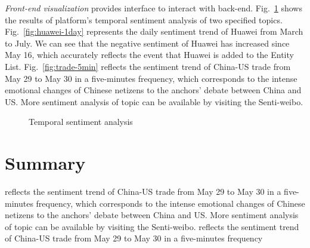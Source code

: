 \documentclass[runningheads]{llncs}
\begin{document}
\textit{Front-end visualization} provides interface to interact with back-end. Fig.~\ref{fig:sentiment-trend} shows the results of platform's temporal sentiment analysis of two specified topics. Fig.~\ref{fig:huawei-1day} represents the daily sentiment trend of Huawei from March to July. We can see that the negative sentiment of Huawei has increased since May 16, which accurately reflects the event that Huawei is added to the Entity List. Fig.~\ref{fig:trade-5min} reflects the sentiment trend of China-US trade from May 29 to May 30 in a five-minutes frequency, which corresponds to the intense emotional changes of Chinese netizens to the anchors' debate between China and US. More sentiment analysis of topic can be available by visiting the Senti-weibo. 

\begin{figure}[ht]
\vspace{-0.5cm}   %
\centering  %
\caption{Temporal sentiment analysis}
\label{fig:sentiment-trend}
\end{figure}

\section{Summary}
 reflects the sentiment trend of China-US trade from May 29 to May 30 in a five-minutes frequency, which corresponds to the intense emotional changes of Chinese netizens to the anchors' debate between China and US. More sentiment analysis of topic can be available by visiting the Senti-weibo. reflects the sentiment trend of China-US trade from May 29 to May 30 in a five-minutes frequency
 


\end{document}
